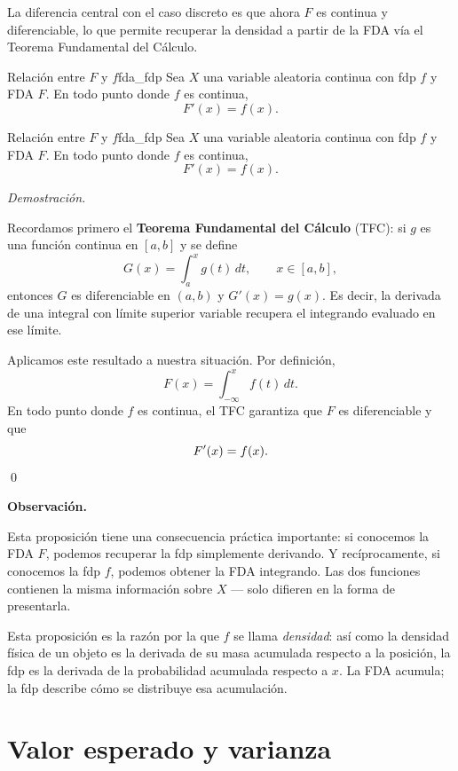 \documentclass[12pt, a4paper]{book}
\newenvironment{observacion}{%
    \par\medskip\noindent\textbf{\color{azul}Observaci\'{o}n.}\enspace\itshape
}{\par\medskip}
\renewenvironment{proof}{%
    \par\medskip\noindent\textit{Demostraci\'{o}n.}\enspace
}{\qed\par\medskip}
\numberwithin{equation}{chapter}
\begin{document}
La diferencia central con el caso discreto es que ahora $F$ es
continua y diferenciable, lo que permite recuperar la densidad a
partir de la FDA vía el Teorema Fundamental del Cálculo.

\begin{proposicion}{Relaci\'{o}n entre $F$ y $f$}{fda_fdp}
	Sea $X$ una variable aleatoria continua con fdp $f$ y FDA $F$.
	En todo punto donde $f$ es continua,
	\[
	F'(x) = f(x).
	\]
\end{proposicion}

\begin{proposicion}{Relaci\'{o}n entre $F$ y $f$}{fda_fdp}
	Sea $X$ una variable aleatoria continua con fdp $f$ y FDA $F$.
	En todo punto donde $f$ es continua,
	\[
	F'(x) = f(x).
	\]
\end{proposicion}

\begin{proof}
	Recordamos primero el \textbf{Teorema Fundamental del C\'{a}lculo}
	(TFC): si $g$ es una función continua en $[a,b]$ y se define
	\[
	G(x) = \int_a^x g(t)\,dt, \qquad x \in [a,b],
	\]
	entonces $G$ es diferenciable en $(a,b)$ y $G'(x) = g(x)$.
	Es decir, la derivada de una integral con límite superior
	variable recupera el integrando evaluado en ese límite.
	
	Aplicamos este resultado a nuestra situación. Por definición,
	\[
	F(x) = \int_{-\infty}^{x} f(t)\,dt.
	\]
	En todo punto donde $f$ es continua, el TFC garantiza que $F$
	es diferenciable y que
	\[
	F'(x) = f(x). \qedhere
	\]
\end{proof}

\begin{observacion}
	Esta proposición tiene una consecuencia práctica importante:
	si conocemos la FDA $F$, podemos recuperar la fdp simplemente
	derivando. Y recíprocamente, si conocemos la fdp $f$, podemos
	obtener la FDA integrando. Las dos funciones contienen la misma
	información sobre $X$ --- solo difieren en la forma de
	presentarla.
\end{observacion}


Esta proposición es la razón por la que $f$ se llama
\emph{densidad}: así como la densidad física de un objeto es la
derivada de su masa acumulada respecto a la posición, la fdp es
la derivada de la probabilidad acumulada respecto a $x$. La FDA
acumula; la fdp describe cómo se distribuye esa acumulación.


\section{Valor esperado y varianza}
\end{document}
